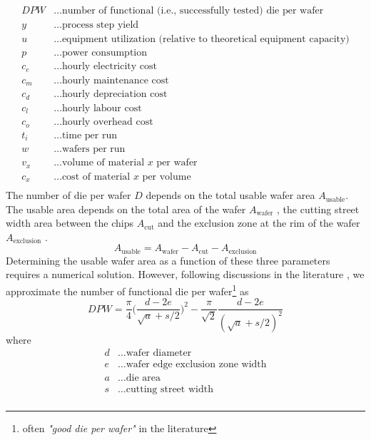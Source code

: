 \documentclass[parskip=full]{article}
\begin{document}
\begin{align*}
        DPW &\dots \text{number of functional (i.e., successfully tested) die per wafer}\\
        y &\dots \text{process step yield} \\
        u &\dots \text{equipment utilization (relative to theoretical equipment capacity)} \\
        p &\dots \text{power consumption} \\
        c_e &\dots \text{hourly electricity cost} \\
        c_m &\dots \text{hourly maintenance cost} \\
        c_d &\dots \text{hourly depreciation cost}\\
        c_l &\dots \text{hourly labour cost} \\
        c_o &\dots \text{hourly overhead cost} \\
        t_i &\dots \text{time per run} \\
        w &\dots \text{wafers per run} \\
        v_x &\dots \text{volume of material $x$ per wafer} \\
        c_x &\dots \text{cost of material $x$ per volume}\\
\end{align*}
%
The number of die per wafer $D$ depends on the total usable wafer area $A_{\text{usable}}$. The usable area depends on the total area of the wafer $A_{\text{wafer}}$ , the cutting street width area between the chips $A_{\text{cut}}$  and the exclusion zone at the rim of the wafer $A_{\text{exclusion}}$ .
%
\begin{equation}
	A_{\text{usable}}=A_{\text{wafer}}-A_{\text{cut}}-A_{\text{exclusion}}
\end{equation}
%
Determining the usable wafer area as a function of these three parameters requires a numerical solution. However, following discussions in the literature \cite{de2005investigation}, we approximate the number of functional die per wafer\footnote{often \textit{"good die per wafer"} in the literature} as
%
\begin{equation}
\label{eqn:dpw}
	DPW = \frac{\pi}{4}  \bigg ( \frac{d-2e}{\sqrt{a}+s/2} \bigg ) ^2 - \frac{\pi}{\sqrt{2}}\frac{d-2e}{(\sqrt{a}+s/2)^2}
\end{equation}
%
where
%
\begin{align*}
    d &\dots \text{wafer diameter} \\
    e &\dots \text{wafer edge exclusion zone width} \\
    a &\dots \text{die area} \\
    s &\dots \text{cutting street width} \\
\end{align*}
\end{document}
